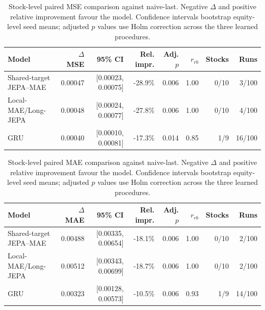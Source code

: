 \begin{table}[t]
\centering
\small
\caption{Stock-level paired MSE comparison against naive-last. Negative $\Delta$ and positive relative improvement favour the model. Confidence intervals bootstrap equity-level seed means; adjusted $p$ values use Holm correction across the three learned procedures.}
\label{tab:paired_mse_naive}
\begin{tabular}{lrrrrrrr}
\toprule
Model & $\Delta$MSE & 95\% CI & Rel. impr. & Adj. $p$ & $r_{rb}$ & Stocks & Runs \\
\midrule
Shared-target JEPA--MAE & 0.00047 & [0.00023, 0.00075] & -28.9\% & 0.006 & 1.00 & 0/10 & 3/100 \\
Local-MAE/Long-JEPA & 0.00048 & [0.00024, 0.00077] & -27.8\% & 0.006 & 1.00 & 0/10 & 4/100 \\
GRU & 0.00040 & [0.00010, 0.00081] & -17.3\% & 0.014 & 0.85 & 1/9 & 16/100 \\
\bottomrule
\end{tabular}
\end{table}

\begin{table}[t]
\centering
\small
\caption{Stock-level paired MAE comparison against naive-last. Negative $\Delta$ and positive relative improvement favour the model. Confidence intervals bootstrap equity-level seed means; adjusted $p$ values use Holm correction across the three learned procedures.}
\label{tab:paired_mae_naive}
\begin{tabular}{lrrrrrrr}
\toprule
Model & $\Delta$MAE & 95\% CI & Rel. impr. & Adj. $p$ & $r_{rb}$ & Stocks & Runs \\
\midrule
Shared-target JEPA--MAE & 0.00488 & [0.00335, 0.00654] & -18.1\% & 0.006 & 1.00 & 0/10 & 2/100 \\
Local-MAE/Long-JEPA & 0.00512 & [0.00343, 0.00699] & -18.7\% & 0.006 & 1.00 & 0/10 & 2/100 \\
GRU & 0.00323 & [0.00128, 0.00573] & -10.5\% & 0.006 & 0.93 & 1/9 & 14/100 \\
\bottomrule
\end{tabular}
\end{table}
